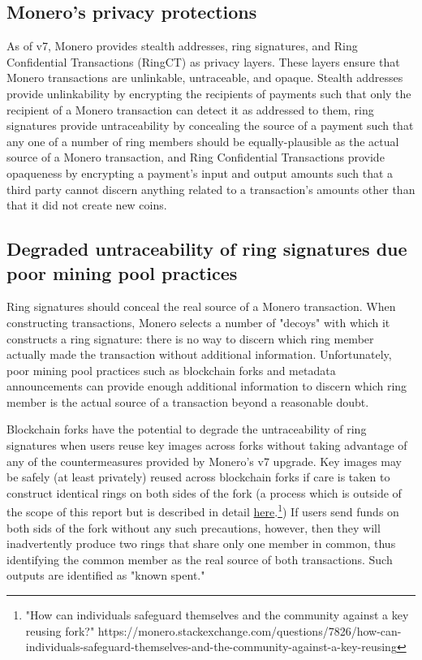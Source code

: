 \documentclass[notitlepage]{report}
\begin{document}
\subsection{Monero's privacy protections}

As of v7, Monero provides stealth addresses, ring signatures, and Ring Confidential Transactions (RingCT) as privacy layers.  These layers ensure that Monero transactions are unlinkable, untraceable, and opaque.  Stealth addresses provide unlinkability by encrypting the recipients of payments such that only the recipient of a Monero transaction can detect it as addressed to them, ring signatures provide untraceability by concealing the source of a payment such that any one of a number of ring members should be equally-plausible as the actual source of a Monero transaction, and Ring Confidential Transactions provide opaqueness by encrypting a payment's input and output amounts such that a third party cannot discern anything related to a transaction's amounts other than that it did not create new coins.

\subsection{Degraded untraceability of ring signatures due poor mining pool practices}

Ring signatures should conceal the real source of a Monero transaction.  When constructing transactions, Monero selects a number of "decoys" with which it constructs a ring signature: there is no way to discern which ring member actually made the transaction without additional information.  Unfortunately, poor mining pool practices such as blockchain forks and metadata announcements can provide enough additional information to discern which ring member is the actual source of a transaction beyond a reasonable doubt.

Blockchain forks have the potential to degrade the untraceability of ring signatures when users reuse key images across forks without taking advantage of any of the countermeasures provided by Monero's v7 upgrade.  Key images may be safely (at least privately) reused across blockchain forks if care is taken to construct identical rings on both sides of the fork (a process which is outside of the scope of this report but is described in detail \href{https://monero.stackexchange.com/questions/7826/how-can-individuals-safeguard-themselves-and-the-community-against-a-key-reusing}{here}.\footnote{"How can individuals safeguard themselves and the community against a key reusing fork?" https://monero.stackexchange.com/questions/7826/how-can-individuals-safeguard-themselves-and-the-community-against-a-key-reusing})  If users send funds on both sids of the fork without any such precautions, however, then they will inadvertently produce two rings that share only one member in common, thus identifying the common member as the real source of both transactions.  Such outputs are identified as "known spent."
\end{document}
